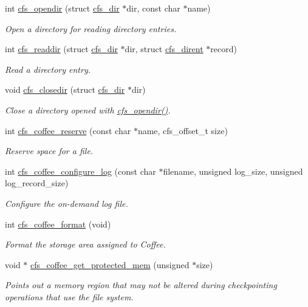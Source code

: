 \begin{DoxyCompactItemize}
\item 
int \hyperlink{group__cfs_gab4df33476a46ca00caf8de9cbb3e8f05}{cfs\+\_\+opendir} (struct \hyperlink{structcfs__dir}{cfs\+\_\+dir} $\ast$dir, const char $\ast$name)
\begin{DoxyCompactList}\small\item\em Open a directory for reading directory entries. \end{DoxyCompactList}\item 
int \hyperlink{group__cfs_ga6367d2b762784fabea2ad1f533aa4bf4}{cfs\+\_\+readdir} (struct \hyperlink{structcfs__dir}{cfs\+\_\+dir} $\ast$dir, struct \hyperlink{structcfs__dirent}{cfs\+\_\+dirent} $\ast$record)
\begin{DoxyCompactList}\small\item\em Read a directory entry. \end{DoxyCompactList}\item 
void \hyperlink{group__cfs_gaef17820cc7daaeac661e401ca7b3054b}{cfs\+\_\+closedir} (struct \hyperlink{structcfs__dir}{cfs\+\_\+dir} $\ast$dir)
\begin{DoxyCompactList}\small\item\em Close a directory opened with \hyperlink{group__cfs_gab4df33476a46ca00caf8de9cbb3e8f05}{cfs\+\_\+opendir()}. \end{DoxyCompactList}\item 
int \hyperlink{group__cfs_ga2586fe834b8b6e943c5e116919edb357}{cfs\+\_\+coffee\+\_\+reserve} (const char $\ast$name, cfs\+\_\+offset\+\_\+t size)
\begin{DoxyCompactList}\small\item\em Reserve space for a file. \end{DoxyCompactList}\item 
int \hyperlink{group__cfs_ga00f5e8bad702aa74e5c14fc6f60064c8}{cfs\+\_\+coffee\+\_\+configure\+\_\+log} (const char $\ast$filename, unsigned log\+\_\+size, unsigned log\+\_\+record\+\_\+size)
\begin{DoxyCompactList}\small\item\em Configure the on-\/demand log file. \end{DoxyCompactList}\item 
int \hyperlink{group__cfs_ga20f73caab6f11eebc05378fe9d4606b3}{cfs\+\_\+coffee\+\_\+format} (void)
\begin{DoxyCompactList}\small\item\em Format the storage area assigned to Coffee. \end{DoxyCompactList}\item 
void $\ast$ \hyperlink{group__cfs_gae4e97787746c7040c54f5adf60d4709b}{cfs\+\_\+coffee\+\_\+get\+\_\+protected\+\_\+mem} (unsigned $\ast$size)
\begin{DoxyCompactList}\small\item\em Points out a memory region that may not be altered during checkpointing operations that use the file system. \end{DoxyCompactList}\end{DoxyCompactItemize}


